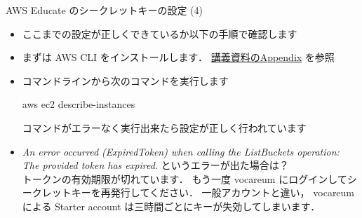 \documentclass[unicode,11pt]{beamer}
\begin{document}
\begin{frame}{AWS Educate のシークレットキーの設定 (4)}

\begin{itemize}
    \item ここまでの設定が正しくできているか以下の手順で確認します
    \item まずは AWS CLI をインストールします．
    \href{https://tomomano.github.io/learn-aws-by-coding/}{講義資料のAppendix}
    を参照
    \item コマンドラインから次のコマンドを実行します
    \begin{semiverbatim}
    aws ec2 describe-instances
    \end{semiverbatim}
    コマンドがエラーなく実行出来たら設定が正しく行われています
    \item \emph{An error occurred (ExpiredToken) when calling the ListBuckets operation: The provided token has expired.} というエラーが出た場合は？\\
    トークンの有効期限が切れています．
    もう一度 vocareum にログインしてシークレットキーを再発行してください．
    一般アカウントと違い， vocareum による Starter account は三時間ごとにキーが失効してしまいます．
\end{itemize}

\end{frame}
\end{document}

